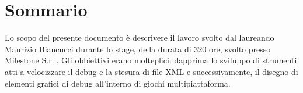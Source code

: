
\cleardoublepage
{}
{}
\begingroup
\let\clearpage\relax
\let\cleardoublepage\relax
\let\cleardoublepage\relax

\chapter*{Sommario}

Lo scopo del presente documento è descrivere il lavoro svolto dal laureando Maurizio Biancucci durante lo stage, della durata di 320 ore, svolto presso Milestone S.r.l.
Gli obbiettivi erano molteplici: dapprima lo sviluppo di strumenti atti a velocizzare il debug e la stesura di file XML e successivamente, il disegno di elementi grafici di debug all'interno di giochi multipiattaforma.

%
%

\endgroup			

\vfill

